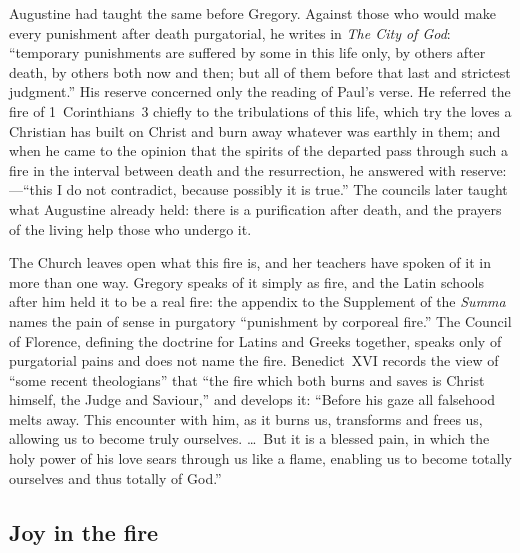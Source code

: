 Augustine had taught the same before Gregory. Against those who would make every punishment after death purgatorial, he writes in \emph{The City of God}: ``temporary punishments are suffered by some in this life only, by others after death, by others both now and then; but all of them before that last and strictest judgment.'' His reserve concerned only the reading of Paul's verse. He referred the fire of 1~Corinthians~3 chiefly to the tribulations of this life, which try the loves a Christian has built on Christ and burn away whatever was earthly in them; and when he came to the opinion that the spirits of the departed pass through such a fire in the interval between death and the resurrection, he answered with reserve: ---``this I do not contradict, because possibly it is true.'' The councils later taught what Augustine already held: there is a purification after death, and the prayers of the living help those who undergo it.

The Church leaves open what this fire is, and her teachers have spoken of it in more than one way. Gregory speaks of it simply as fire, and the Latin schools after him held it to be a real fire: the appendix to the Supplement of the \emph{Summa} names the pain of sense in purgatory ``punishment by corporeal fire.'' The Council of Florence, defining the doctrine for Latins and Greeks together, speaks only of purgatorial pains and does not name the fire. Benedict~XVI records the view of ``some recent theologians'' that ``the fire which both burns and saves is Christ himself, the Judge and Saviour,'' and develops it: ``Before his gaze all falsehood melts away. This encounter with him, as it burns us, transforms and frees us, allowing us to become truly ourselves. \ldots\ But it is a blessed pain, in which the holy power of his love sears through us like a flame, enabling us to become totally ourselves and thus totally of God.''

\subsection{Joy in the fire}

